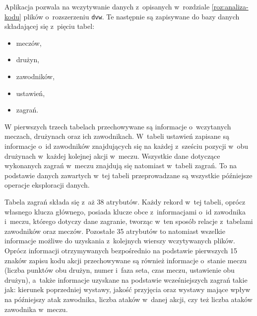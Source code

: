 \documentclass[a4paper,twoside,12pt]{book}
\begin{document}
Aplikacja pozwala na wczytywanie danych z~opisanych w~rozdziale \ref{roz:analiza-kodu} plików o~rozszerzeniu \texttt{dvw}. Te następnie są zapisywane do bazy danych składającej się z~pięciu tabel: 
\begin{itemize}
\item meczów,
\item drużyn,
\item zawodników,
\item ustawień,
\item zagrań.
\end{itemize}
W pierwszych trzech tabelach przechowywane są informacje o~wczytanych meczach, drużynach oraz ich zawodnikach. W~tabeli ustawień zapisane są informacje o~id zawodników znajdujących się na każdej z~sześciu pozycji w~obu drużynach w~każdej kolejnej akcji w~meczu. Wszystkie dane dotyczące wykonanych zagrań w~meczu znajdują się natomiast w~tabeli zagrań. To na podstawie danych zawartych w~tej tabeli przeprowadzane są wszystkie późniejsze operacje eksploracji danych. 

Tabela zagrań składa się z~aż 38 atrybutów. Każdy rekord w~tej tabeli, oprócz własnego klucza głównego, posiada klucze obce z~informacjami o~id zawodnika i~meczu, którego dotyczy dane zagranie, tworząc w~ten sposób relacje z~tabelami zawodników oraz meczów. Pozostałe 35 atrybutów to natomiast wszelkie informacje możliwe do uzyskania z~kolejnych wierszy wczytywanych plików. Oprócz informacji otrzymywanych bezpośrednio na podstawie pierwszych 15 znaków zapisu kodu akcji przechowywane są również informacje o~stanie meczu (liczba punktów obu drużyn, numer i~faza seta, czas meczu, ustawienie obu drużyn), a~także informacje uzyskane na podstawie wcześniejszych zagrań takie jak: kierunek poprzedniej wystawy, jakość przyjęcia oraz wystawy mające wpływ na późniejszy atak zawodnika, liczba ataków w~danej akcji, czy też liczba ataków zawodnika w~meczu. 
\end{document}
